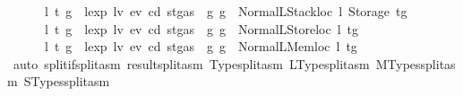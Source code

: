 \begin{isabellebody}
\ \ \ \ {\isacharbar}{\kern0pt}\ {\isacharparenleft}{\kern0pt}{}{}{\isacharparenright}{\kern0pt}\ l\ t{\isacharprime}{\kern0pt}\ g{\isacharprime}{\kern0pt}\ \ {\isachardoublequoteopen}lexp\ lv\ ev\ cd\ {\isacharparenleft}{\kern0pt}st{\isasymlparr}gas\ {\isacharcolon}{\kern0pt}{\isacharequal}{\kern0pt}\ g{\isasymrparr}{\isacharparenright}{\kern0pt}\ g\ {\isacharequal}{\kern0pt}\ Normal{\isacharparenleft}{\kern0pt}{\isacharparenleft}{\kern0pt}LStackloc\ l{\isacharcomma}{\kern0pt}\ Storage\ t{\isacharprime}{\kern0pt}{\isacharparenright}{\kern0pt}{\isacharcomma}{\kern0pt}g{\isacharprime}{\kern0pt}{\isacharparenright}{\kern0pt}{\isachardoublequoteclose}\isanewline
\ \ \ \ {\isacharbar}{\kern0pt}\ {\isacharparenleft}{\kern0pt}{}{}{\isacharparenright}{\kern0pt}\ l\ t{\isacharprime}{\kern0pt}\ g{\isacharprime}{\kern0pt}\ \ {\isachardoublequoteopen}lexp\ lv\ ev\ cd\ {\isacharparenleft}{\kern0pt}st{\isasymlparr}gas\ {\isacharcolon}{\kern0pt}{\isacharequal}{\kern0pt}\ g{\isasymrparr}{\isacharparenright}{\kern0pt}\ g\ {\isacharequal}{\kern0pt}\ Normal{\isacharparenleft}{\kern0pt}{\isacharparenleft}{\kern0pt}LStoreloc\ l{\isacharcomma}{\kern0pt}\ t{\isacharprime}{\kern0pt}{\isacharparenright}{\kern0pt}{\isacharcomma}{\kern0pt}g{\isacharprime}{\kern0pt}{\isacharparenright}{\kern0pt}{\isachardoublequoteclose}\isanewline
\ \ \ \ {\isacharbar}{\kern0pt}\ {\isacharparenleft}{\kern0pt}{}{}{\isacharparenright}{\kern0pt}\ l\ t{\isacharprime}{\kern0pt}\ g{\isacharprime}{\kern0pt}\ \ {\isachardoublequoteopen}lexp\ lv\ ev\ cd\ {\isacharparenleft}{\kern0pt}st{\isasymlparr}gas\ {\isacharcolon}{\kern0pt}{\isacharequal}{\kern0pt}\ g{\isasymrparr}{\isacharparenright}{\kern0pt}\ g\ {\isacharequal}{\kern0pt}\ Normal{\isacharparenleft}{\kern0pt}{\isacharparenleft}{\kern0pt}LMemloc\ l{\isacharcomma}{\kern0pt}\ t{\isacharprime}{\kern0pt}{\isacharparenright}{\kern0pt}{\isacharcomma}{\kern0pt}g{\isacharprime}{\kern0pt}{\isacharparenright}{\kern0pt}{\isachardoublequoteclose}\isanewline
\ \ \ \ \ \ \isamarkupfalse%
\ {\isacharparenleft}{\kern0pt}auto\ split{\isacharcolon}{\kern0pt}if{\isacharunderscore}{\kern0pt}split{\isacharunderscore}{\kern0pt}asm\ result{\isachardot}{\kern0pt}split{\isacharunderscore}{\kern0pt}asm\ Type{\isachardot}{\kern0pt}split{\isacharunderscore}{\kern0pt}asm\ LType{\isachardot}{\kern0pt}split{\isacharunderscore}{\kern0pt}asm\ MTypes{\isachardot}{\kern0pt}split{\isacharunderscore}{\kern0pt}asm\ STypes{\isachardot}{\kern0pt}split{\isacharunderscore}{\kern0pt}asm{\isacharparenright}{\kern0pt}\isanewline

\end{isabellebody}
